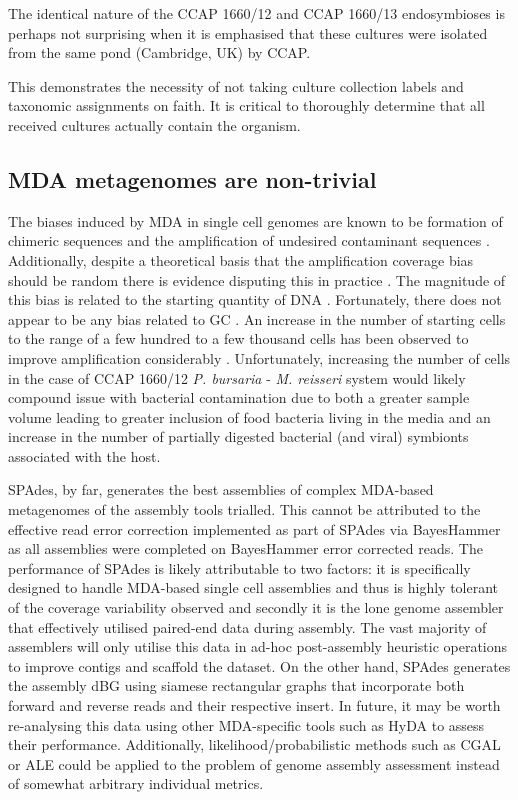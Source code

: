 The identical nature of the CCAP 1660/12 and CCAP 1660/13 endosymbioses is perhaps not surprising
when it is emphasised that these cultures were isolated from the same
pond (Cambridge, UK) by CCAP. 

This demonstrates the necessity of not taking culture collection labels and taxonomic
assignments on faith. It is critical to thoroughly determine that all received
cultures actually contain the organism.

\subsection{MDA metagenomes are non-trivial}

The biases induced by MDA in single cell genomes are known to be 
formation of chimeric sequences and the amplification
of undesired contaminant sequences \citep{Binga2008}.
Additionally, despite a theoretical basis that
the amplification coverage bias should be random \citep{Hosono2003}
there is evidence disputing this in practice \citep{Ellegaard2013}.
The magnitude of this bias is related to the starting
quantity of DNA \citep{Ellegaard2013a}.
Fortunately, there does not appear to be any bias
related to GC \citep{Ellegaard2013a}.
An increase in the number of starting cells to the range of
a few hundred to a few thousand cells
has been observed to improve amplification considerably \citep{Ellegaard2013a}. 
Unfortunately, increasing the number of cells in the case
of CCAP 1660/12 \textit{P. bursaria} - \textit{M. reisseri} system
would likely compound issue with bacterial contamination due 
to both a greater sample volume leading to greater inclusion
of food bacteria living in the media and an increase in the
number of partially digested bacterial (and viral) symbionts
associated with the host. 

SPAdes, by far, generates the best assemblies of complex
MDA-based metagenomes of the assembly tools trialled. 
This cannot be attributed to the effective read error correction
implemented as part of SPAdes via BayesHammer as all assemblies
were completed on BayesHammer error corrected reads. The performance
of SPAdes is likely attributable to two factors: it is specifically
designed to handle MDA-based single cell assemblies and thus is 
highly tolerant of the coverage variability observed and secondly
it is the lone genome assembler that effectively utilised
paired-end data during assembly.  The vast majority of assemblers
will only utilise this data in ad-hoc post-assembly heuristic operations
to improve contigs and scaffold the dataset.  On the other hand,
SPAdes generates the assembly dBG using siamese rectangular
graphs that incorporate both forward and reverse reads and their 
respective insert. 
In future, it may be worth re-analysing this data using
other MDA-specific tools such as HyDA to assess their performance. 
Additionally, likelihood/probabilistic methods such as
CGAL \citep{Rahman2013} or ALE \citep{Clark2013} could be applied
to the problem of genome assembly assessment instead of somewhat arbitrary
individual metrics.


